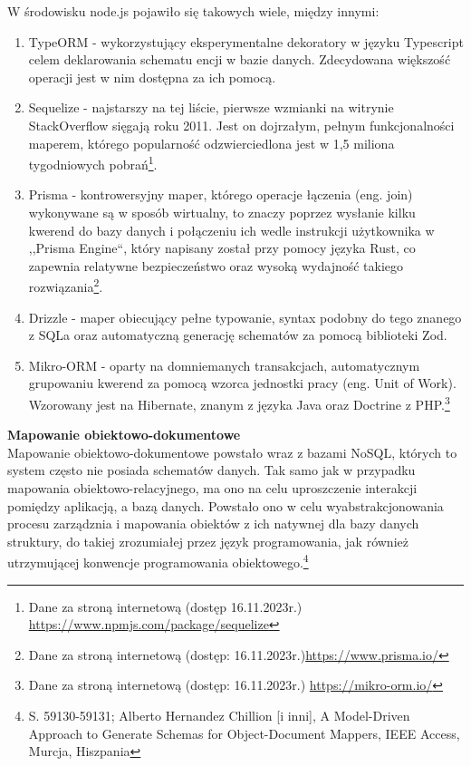 \documentclass[12pt, a4paper, twoside, openany]{book}
\begin{document}
W środowisku node.js pojawiło się takowych wiele, między innymi:
\begin{enumerate}[label=--]
    \item TypeORM - wykorzystujący eksperymentalne dekoratory w języku Typescript celem deklarowania schematu encji w bazie danych. Zdecydowana większość operacji jest w nim dostępna za ich pomocą.
    \item Sequelize - najstarszy na tej liście, pierwsze wzmianki na witrynie StackOverflow sięgają roku 2011. Jest on dojrzałym, pełnym funkcjonalności maperem, którego popularność odzwierciedlona jest w 1,5 miliona tygodniowych pobrań\footnote{Dane za stroną internetową (dostęp 16.11.2023r.) \url{https://www.npmjs.com/package/sequelize}}.
    \item Prisma - kontrowersyjny maper, którego operacje łączenia (eng. join) wykonywane są w sposób wirtualny, to znaczy poprzez wysłanie kilku kwerend do bazy danych i połączeniu ich wedle instrukcji użytkownika w ,,Prisma Engine``, który napisany został przy pomocy języka Rust, co zapewnia relatywne bezpieczeństwo oraz wysoką wydajność takiego rozwiązania\footnote{Dane za stroną internetową (dostęp: 16.11.2023r.)\url{https://www.prisma.io/}}.
    \item Drizzle - maper obiecujący pełne typowanie, syntax podobny do tego znanego z SQLa oraz automatyczną generację schematów za pomocą biblioteki Zod.
    \item Mikro-ORM - oparty na domniemanych transakcjach, automatycznym grupowaniu kwerend za pomocą wzorca jednostki pracy (eng. Unit of Work). Wzorowany jest na Hibernate, znanym z języka Java oraz Doctrine z PHP.\footnote{Dane za stroną internetową (dostęp: 16.11.2023r.) \url{https://mikro-orm.io/}}
\end{enumerate}

\textbf{Mapowanie obiektowo-dokumentowe\\}
Mapowanie obiektowo-dokumentowe powstało wraz z bazami NoSQL, których to system często nie posiada schematów danych.
Tak samo jak w przypadku mapowania obiektowo-relacyjnego, ma ono na celu uproszczenie interakcji pomiędzy aplikacją, a bazą danych. Powstało ono w celu wyabstrakcjonowania procesu zarządznia i mapowania obiektów z ich natywnej dla bazy danych struktury, do takiej zrozumiałej przez język programowania, jak również utrzymującej konwencje programowania obiektowego.\footnote{S. 59130-59131; Alberto Hernandez Chillion [i inni], A Model-Driven Approach to Generate Schemas for Object-Document Mappers, IEEE Access, Murcja, Hiszpania}
\end{document}
